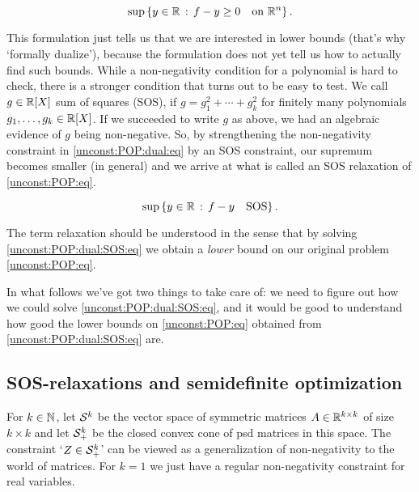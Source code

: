 \begin{equation}
	\sup \left\{ y \in \mathbb{R} \,:\,  f - y \ge 0 \quad \text{on} \ \mathbb{R}^n \right\}. \label{unconst:POP:dual:eq}
\end{equation}

This formulation just tells us that we are interested in lower bounds (that's why `formally dualize'), because the formulation does not yet tell us how to actually find such bounds. While a non-negativity condition for a polynomial is hard to check, there is a stronger condition that turns out to be easy to test. We call $g \in \mathbb{R}[X]$ sum of squares (SOS), if $g= g_1^2 + \cdots + g_k^2$ for finitely many polynomials $g_1,\ldots,g_k \in \mathbb{R}[X]$. If we succeeded to write $g$ as above, we had an algebraic evidence of $g$ being non-negative. So, by strengthening the non-negativity constraint in \eqref{unconst:POP:dual:eq} by an SOS constraint, our supremum becomes smaller (in general) and we arrive at what is called an SOS relaxation of \eqref{unconst:POP:eq}. 

\begin{equation}
\sup \left\{ y \in \mathbb{R} \,:\,  f - y \quad \text{SOS} \right\}. \label{unconst:POP:dual:SOS:eq}
\end{equation}

The term relaxation should be understood in the sense that by solving \eqref{unconst:POP:dual:SOS:eq} we obtain a \emph{lower} bound on our original problem \eqref{unconst:POP:eq}. 

In what follows we've got two things to take care of: we need to figure out how we could solve  \eqref{unconst:POP:dual:SOS:eq}, and it would be good to understand how good the lower bounds on \eqref{unconst:POP:eq} obtained from \eqref{unconst:POP:dual:SOS:eq} are.


\subsection{SOS-relaxations and semidefinite optimization}

\label{SOS:and:sdp}

For $k \in \mathbb{N}$, let $\mathcal{S}^k$ be the vector space of symmetric matrices $A \in \mathbb{R}^{k \times k}$ of size $k \times k$ and let $\mathcal{S}_+^k$ be the closed convex cone of psd matrices in this space. The constraint `$Z \in \mathcal{S}_+^k$' can be viewed as a generalization of non-negativity to the world of matrices. For $k=1$ we just have a regular non-negativity constraint for real variables. 

